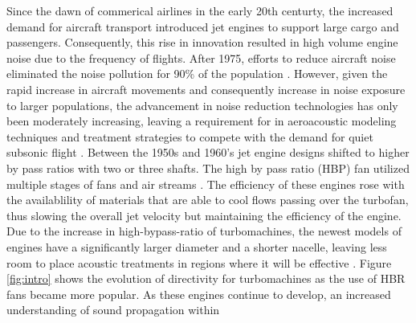 Since the dawn of commerical airlines in the early 20th centurty, the increased demand for aircraft transport
introduced jet engines to support large cargo and passengers. Consequently,
this rise in innovation resulted in high volume engine noise due to 
the frequency of flights. After 1975, 
efforts to reduce aircraft noise eliminated the noise pollution for 90\% of
the population \cite{FAAPolicy}.  However, given the rapid increase in
aircraft movements and consequently increase in noise exposure to larger 
populations, the advancement in noise reduction 
technologies has only been moderately increasing, leaving a requirement for 
in aeroacoustic modeling techniques and treatment strategies to compete with 
the demand for quiet subsonic flight \cite{icao2020}.  
Between the 1950s and 1960's jet engine designs shifted to higher by pass 
ratios with two or three shafts. The high by pass ratio (HBP) fan utilized multiple
stages of fans and  air streams \cite{smith1989aircraft}. The efficiency of these
engines rose with the availablility of materials that are able to cool flows
passing over the turbofan, thus slowing the overall jet velocity but maintaining the 
efficiency of the engine. 
Due to the increase in high-bypass-ratio of turbomachines, the newest models of 
engines have a significantly larger diameter and a shorter nacelle, leaving less
room to place acoustic treatments in regions where it will be effective \cite{Kozaczuk2017}.
Figure \ref{fig:intro} shows the evolution of directivity for turbomachines as 
the use of HBR fans became more popular. As these engines continue 
to develop, an increased understanding of sound propagation within
